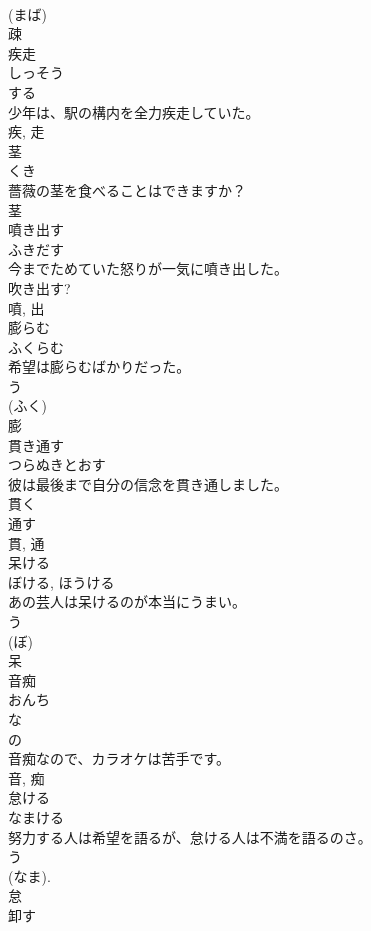 \documentclass[8pt]{extreport}
\begin{document}
\begin{CJK}{UTF8}{min}
\\	(まば) 
\\	疎	
\\	疾走	
\\	しっそう	
\\	する 
\\	少年は、駅の構内を全力疾走していた。	
\\	疾, 走	
\\	茎	
\\	くき	
\\	薔薇の茎を食べることはできますか？	
\\	茎	
\\	噴き出す	
\\	ふきだす	
\\	今までためていた怒りが一気に噴き出した。	
\\	吹き出す? 
\\	噴, 出	
\\	膨らむ	
\\	ふくらむ	
\\	希望は膨らむばかりだった。	
\\	う 
\\	(ふく) 
\\	膨	
\\	貫き通す	
\\	つらぬきとおす	
\\	彼は最後まで自分の信念を貫き通しました。	
\\	貫く 
\\	通す 
\\	貫, 通	
\\	呆ける	
\\	ぼける, ほうける	
\\	あの芸人は呆けるのが本当にうまい。	
\\	う 
\\	(ぼ) 
\\	呆	
\\	音痴	
\\	おんち	
\\	な 
\\	の 
\\	音痴なので、カラオケは苦手です。	
\\	音, 痴	
\\	怠ける	
\\	なまける	
\\	努力する人は希望を語るが、怠ける人は不満を語るのさ。	
\\	う 
\\	(なま). 
\\	怠	
\\	卸す	

\end{CJK}
\end{document}
